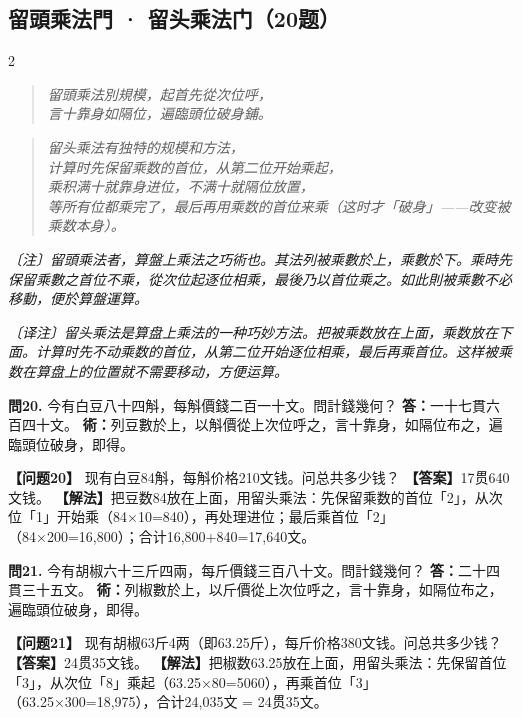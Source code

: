 \documentclass[11pt,a4paper]{article}
\newcommand{\rhymeCL}[1]{%
  \begin{quote}\itshape\color{verselinecolor}#1\end{quote}
}
\newcommand{\rhymeMOD}[1]{%
  \begin{quote}\itshape\color{verselinecolor}#1\end{quote}
}
\newcommand{\noteCL}[1]{\par\textcolor{notecolor}{\small\textit{〔注〕#1}}\par\smallskip}
\newcommand{\noteMOD}[1]{\par\textcolor{notecolor}{\small\textit{〔译注〕#1}}\par\smallskip}
\begin{document}
\subsection{留頭乘法門 · 留头乘法门（20题）}
\label{sec:liutou}

\begin{paracol}{2}
\rhymeCL{留頭乘法別規模，起首先從次位呼，\\
言十靠身如隔位，遍臨頭位破身鋪。}
\switchcolumn
\rhymeMOD{留头乘法有独特的规模和方法，\\
计算时先保留乘数的首位，从第二位开始乘起，\\
乘积满十就靠身进位，不满十就隔位放置，\\
等所有位都乘完了，最后再用乘数的首位来乘（这时才「破身」——改变被乘数本身）。}
\switchcolumn*
\noteCL{留頭乘法者，算盤上乘法之巧術也。其法列被乘數於上，乘數於下。乘時先保留乘數之首位不乘，從次位起逐位相乘，最後乃以首位乘之。如此則被乘數不必移動，便於算盤運算。}
\switchcolumn
\noteMOD{留头乘法是算盘上乘法的一种巧妙方法。把被乘数放在上面，乘数放在下面。计算时先不动乘数的首位，从第二位开始逐位相乘，最后再乘首位。这样被乘数在算盘上的位置就不需要移动，方便运算。}

\switchcolumn*

\textbf{問20.} 今有白豆八十四斛，每斛價錢二百一十文。問計錢幾何？\break
\textbf{答：}一十七貫六百四十文。\break
\textbf{術：}列豆數於上，以斛價從上次位呼之，言十靠身，如隔位布之，遍臨頭位破身，即得。

\switchcolumn

\textbf{【问题20】} 现有白豆84斛，每斛价格210文钱。问总共多少钱？\break
\textbf{【答案】}17贯640文钱。\break
\textbf{【解法】}把豆数84放在上面，用留头乘法：先保留乘数的首位「2」，从次位「1」开始乘（84×10=840），再处理进位；最后乘首位「2」（84×200=16,800）；合计16,800+840=17,640文。

\switchcolumn*

\textbf{問21.} 今有胡椒六十三斤四兩，每斤價錢三百八十文。問計錢幾何？\break
\textbf{答：}二十四貫三十五文。\break
\textbf{術：}列椒數於上，以斤價從上次位呼之，言十靠身，如隔位布之，遍臨頭位破身，即得。

\switchcolumn

\textbf{【问题21】} 现有胡椒63斤4两（即63.25斤），每斤价格380文钱。问总共多少钱？\break
\textbf{【答案】}24贯35文钱。\break
\textbf{【解法】}把椒数63.25放在上面，用留头乘法：先保留首位「3」，从次位「8」乘起（63.25×80=5060），再乘首位「3」（63.25×300=18,975），合计24,035文 = 24贯35文。


\end{paracol}
\end{document}

